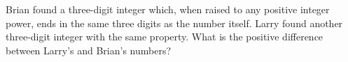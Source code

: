 Brian found a three-digit integer which, when raised to any positive integer power, ends in the same three digits as the number itself. Larry found another three-digit integer with the same property. What is the positive difference between Larry's and Brian's numbers?
